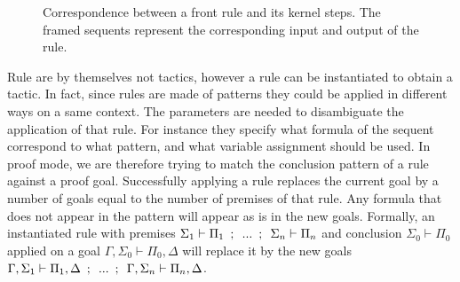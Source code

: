 \begin{figure}[hbt!]
  \centering
  \caption[Correspondence between front rules and kernel steps]{Correspondence between a front rule and its kernel steps. The framed sequents represent the corresponding input and output of the rule.}
  \label{fig:example-rule}
\end{figure}

Rule are by themselves not tactics, however a rule can be instantiated to obtain a tactic. In fact, since rules are made of patterns they could be applied in different ways on a same context. The parameters are needed to disambiguate the application of that rule. For instance they specify what formula of the sequent correspond to what pattern, and what variable assignment should be used. In proof mode, we are therefore trying to match the conclusion pattern of a rule against a proof goal. Successfully applying a rule replaces the current goal by a number of goals equal to the number of premises of that rule. Any formula that does not appear in the pattern will appear as is in the new goals. Formally, an instantiated rule with premises $\Sigma_1 \vdash \Pi_1 \hspace{0.5em} ; \hspace{0.5em} ... \hspace{0.5em} ; \hspace{0.5em} \Sigma_n \vdash \Pi_n$ and conclusion $\Sigma_0 \vdash \Pi_0$ applied on a goal $\Gamma, \Sigma_0 \vdash \Pi_0, \Delta$ will replace it by the new goals $\Gamma, \Sigma_1 \vdash \Pi_1, \Delta \hspace{0.5em} ; \hspace{0.5em} ... \hspace{0.5em} ; \hspace{0.5em} \Gamma, \Sigma_n \vdash \Pi_n, \Delta$.

